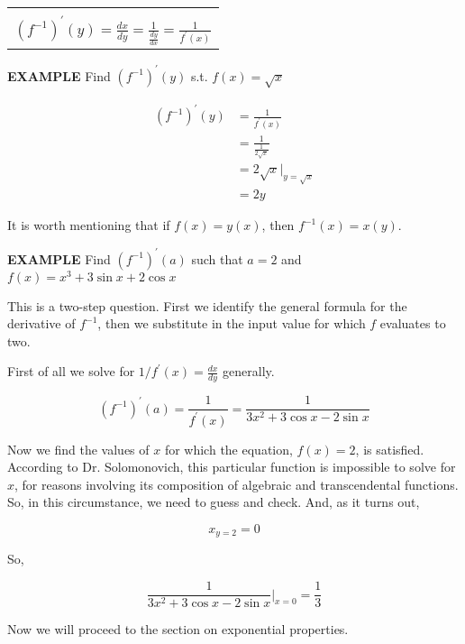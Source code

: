 \documentclass{article}
\begin{document}
\begin{center}
\begin{tabular}{|c|}
\hline\\
$\displaystyle(f^{-1})^\prime(y)=\frac{dx}{dy}=\frac{1}{\frac{dy}{dx}}=\frac{1}{f^\prime(x)}$\\[2em]
\hline
\end{tabular}
\end{center}

{\bf{}EXAMPLE} Find $(f^{-1})^\prime(y)$ s.t. $f(x)=\sqrt{x}$

\begin{align*}
(f^{-1})^\prime(y)&=\frac{1}{f^\prime(x)}\\
&=\frac{1}{\frac{1}{2\sqrt{x}}}\\
&=2\sqrt{x}\big|_{y=\sqrt{x}}\\
&=2y
\end{align*}

It is worth mentioning that if $f(x)=y(x)$, then $f^{-1}(x)=x(y)$.

\vspace{10pt}

{\bf{}EXAMPLE} Find $(f^{-1})^\prime(a)$ such that $a=2$ and $f(x)=x^3+3\sin x+2\cos x$

\vspace{10pt}

This is a two-step question. First we identify the general formula for the derivative of $f^{-1}$, then we substitute in the input value for which $f$ evaluates to two.

\vspace{10pt}

First of all we solve for $1/f^\prime(x)=\frac{dx}{dy}$ generally.

\[(f^{-1})^\prime(a)=\frac{1}{f^\prime(x)}=\frac{1}{3x^2+3\cos x-2\sin x}\]

Now we find the values of $x$ for which the equation, $f(x)=2$, is satisfied. According to Dr. Solomonovich, this particular function is impossible to solve for $x$, for reasons involving its composition of algebraic and transcendental functions. So, in this circumstance, we need to guess and check. And, as it turns out,

\[x_{y=2}=0\]

So,

\[\frac{1}{3x^2+3\cos x-2\sin x}\big|_{x=0}=\frac{1}{3}\]

Now we will proceed to the section on exponential properties.
\end{document}
